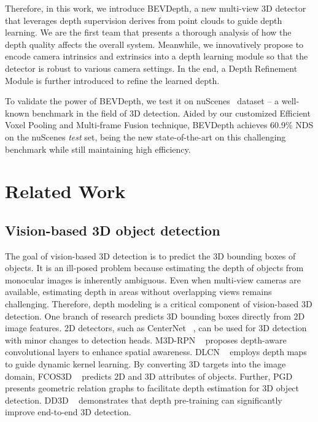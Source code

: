 \documentclass[twocolumn,letterpaper]{article}
\begin{document}
Therefore, in this work, we introduce BEVDepth, a new multi-view 3D detector that leverages depth supervision derives from point clouds to guide depth learning. We are the first team that presents a thorough analysis of how the depth quality affects the overall system. Meanwhile, we innovatively propose to encode camera intrinsics and extrinsics into a depth learning module so that the detector is robust to various camera settings. In the end, a Depth Refinement Module is further introduced to refine the learned depth. 

To validate the power of BEVDepth, we test it on nuScenes~\cite{caesar2020nuscenes} dataset -- a well-known benchmark in the field of 3D detection. Aided by our customized Efficient Voxel Pooling and Multi-frame Fusion technique, BEVDepth achieves 60.9\% NDS on the nuScenes \emph{test} set, being the new state-of-the-art on this challenging benchmark while still maintaining high efficiency.


\section{Related Work} \label{rworks}
\subsection{Vision-based 3D object detection}
The goal of vision-based 3D detection is to predict the 3D bounding boxes of objects. It is an ill-posed problem because estimating the depth of objects from monocular images is inherently ambiguous. Even when multi-view cameras are available, estimating depth in areas without overlapping views remains challenging. Therefore, depth modeling is a critical component of vision-based 3D detection. One branch of research predicts 3D bounding boxes directly from 2D image features. 2D detectors, such as CenterNet ~\cite{zhou2019objects}, can be used for 3D detection with minor changes to detection heads. M3D-RPN ~\cite{brazil2019m3d} proposes depth-aware convolutional layers to enhance spatial awareness. DLCN ~\cite{huo2020learning} employs depth maps to guide dynamic kernel learning. By converting 3D targets into the image domain, FCOS3D ~\cite{wang2021fcos3d} predicts 2D and 3D attributes of objects. Further, PGD ~\cite{wang2022probabilistic} presents geometric relation graphs to facilitate depth estimation for 3D object detection. DD3D ~\cite{park2021pseudo} demonstrates that depth pre-training can significantly improve end-to-end 3D detection.
\end{document}
